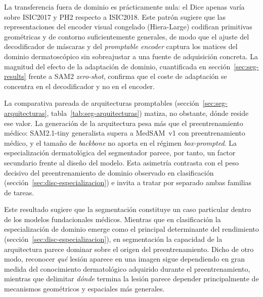 La transferencia fuera de dominio es prácticamente nula: el Dice apenas
varía sobre ISIC2017 y PH2 respecto a ISIC2018. Este patrón sugiere que
las representaciones del encoder visual congelado (Hiera-Large) codifican
primitivas geométricas y de contorno suficientemente generales, de modo
que el ajuste del decodificador de máscaras y del \emph{promptable
encoder} captura los matices del dominio dermatoscópico sin sobreajustar a
una fuente de adquisición concreta. La magnitud del efecto de la
adaptación de dominio, cuantificada en sección~\ref{sec:seg-results}
frente a SAM2 \emph{zero-shot}, confirma que el coste de adaptación se
concentra en el decodificador y no en el encoder.

La comparativa pareada de arquitecturas promptables
(sección~\ref{sec:seg-arquitecturas},
tabla~\ref{tab:seg-arquitecturas}) matiza, no obstante, dónde reside
ese valor. La generación de la arquitectura pesa más que el
preentrenamiento médico: SAM2.1-tiny generalista supera a MedSAM~v1
con preentrenamiento médico, y el tamaño de \emph{backbone} no
aporta en el régimen \emph{box-prompted}. La especialización
dermatológica del segmentador parece, por tanto, un factor
secundario frente al diseño del modelo. Esta asimetría contrasta con
el peso decisivo del preentrenamiento de dominio observado en
clasificación (sección~\ref{sec:disc-especializacion}) e invita a
tratar por separado ambas familias de tareas.

Este resultado sugiere que la segmentación constituye un caso
particular dentro de los modelos fundacionales médicos. Mientras que
en clasificación la especialización de dominio emerge como el principal
determinante del rendimiento (sección~\ref{sec:disc-especializacion}),
en segmentación la capacidad de la arquitectura parece dominar sobre el
origen del preentrenamiento. Dicho de otro modo, reconocer \emph{qué}
lesión aparece en una imagen sigue dependiendo en gran medida del
conocimiento dermatológico adquirido durante el preentrenamiento,
mientras que delimitar \emph{dónde} termina la lesión parece depender
principalmente de mecanismos geométricos y espaciales más generales.

